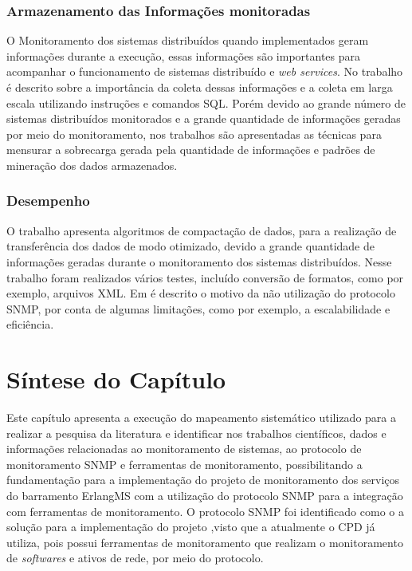 \subsubsection{Armazenamento das Informações monitoradas}

O Monitoramento dos sistemas distribuídos quando implementados geram informações durante a execução, essas informações são importantes para acompanhar o funcionamento de sistemas distribuído e \textit{web services}. No trabalho \cite{phan2009cryptanalysis} é descrito sobre a importância da coleta dessas informações e a coleta em larga escala utilizando instruções e comandos SQL. Porém devido ao grande número de sistemas distribuídos monitorados e a grande quantidade de informações geradas por meio do monitoramento, nos trabalhos \cite{abdu1996monitoring,hirate2009profiling} são apresentadas as técnicas para mensurar a sobrecarga gerada pela quantidade de informações e padrões de mineração dos dados armazenados.  

\subsubsection{Desempenho}

O trabalho \cite{wang2016improvements} apresenta algoritmos de compactação de dados, para a realização de transferência dos dados de modo otimizado, devido a grande quantidade de informações geradas durante o monitoramento dos sistemas distribuídos. Nesse trabalho foram realizados vários testes, incluído conversão de formatos, como por exemplo, arquivos XML. Em \cite{kotsopoulos2008soa} é descrito o motivo da não utilização do protocolo SNMP, por conta de algumas limitações, como por exemplo, a escalabilidade e eficiência. 


\section{Síntese do Capítulo}

Este capítulo apresenta a execução do mapeamento sistemático utilizado para a realizar a pesquisa da literatura e identificar nos trabalhos científicos, dados e informações relacionadas ao monitoramento de sistemas, ao protocolo de monitoramento \acrshort{SNMP} e ferramentas de monitoramento, possibilitando a fundamentação para a implementação do projeto de monitoramento dos serviços do barramento ErlangMS com a utilização do protocolo \acrshort{SNMP} para a integração com ferramentas de monitoramento. O protocolo \acrshort{SNMP} foi identificado como o a solução para a implementação do projeto ,visto que a atualmente o \acrshort{CPD} já utiliza, pois  possui ferramentas de monitoramento que realizam o monitoramento de \textit{softwares} e ativos de rede, por meio do protocolo. 

